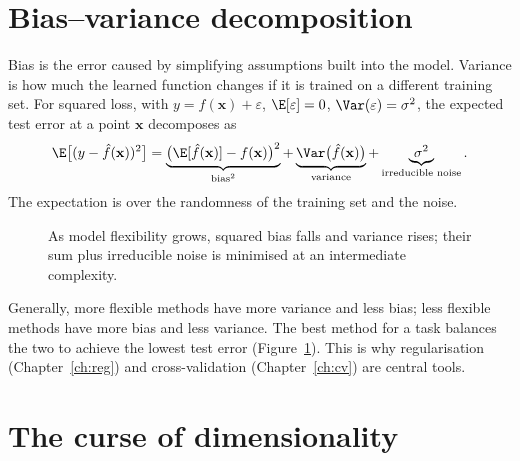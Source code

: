 \documentclass[a4paper, 12pt]{book}
\begin{document}
\section{Bias--variance decomposition}

Bias is the error caused by simplifying assumptions built into the model. Variance is
how much the learned function changes if it is trained on a different training set.
For squared loss, with $y = f(\mathbf{x}) + \varepsilon$,
$\E[\varepsilon]=0$, $\Var(\varepsilon)=\sigma^2$, the expected test error at a point
$\mathbf{x}$ decomposes as
\begin{align}
    \E\big[(y - \hat{f}(\mathbf{x}))^2\big]
    = \underbrace{\big(\E[\hat{f}(\mathbf{x})] - f(\mathbf{x})\big)^2}_{\text{bias}^2}
    + \underbrace{\Var\big(\hat{f}(\mathbf{x})\big)}_{\text{variance}}
    + \underbrace{\sigma^2}_{\text{irreducible noise}}.
\end{align}
The expectation is over the randomness of the training set and the noise.

\begin{figure}[htbp]
\centering
{}
\caption{As model flexibility grows, squared bias falls and variance rises; their sum plus irreducible noise is minimised at an intermediate complexity.}
\label{fig:bias-variance}
\end{figure}

Generally, more flexible methods have more variance and less bias; less flexible
methods have more bias and less variance. The best method for a task balances the two
to achieve the lowest test error (Figure~\ref{fig:bias-variance}). This is why
regularisation (Chapter~\ref{ch:reg}) and cross-validation
(Chapter~\ref{ch:cv}) are central tools.

\section{The curse of dimensionality}
\end{document}
